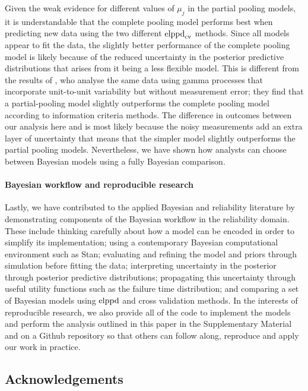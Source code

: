 \documentclass{article}
\begin{document}
Given the weak evidence for different values of $\mu_j$ in the partial pooling models, it is understandable that the complete pooling model performs best when predicting new data using the two different $\hbox{elppd}_\text{cv}$ methods. Since all models appear to fit the data, the slightly better performance of the complete pooling model is likely because of the reduced uncertainty in the posterior predictive distributions that arises from it being a less flexible model. This is different from the results of \citet{rodriguez-picon_degradation_2018}, who analyse the same data using gamma processes that incorporate unit-to-unit variability but without measurement error; they find that a partial-pooling model slightly outperforms the complete pooling model according to information criteria methods. The difference in outcomes between our analysis here and \citet{rodriguez-picon_degradation_2018} is most likely because the noisy measurements add an extra layer of uncertainty that means that the simpler model slightly outperforms the partial pooling models. Nevertheless, we have shown how analysts can choose between Bayesian models using a fully Bayesian comparison.

\paragraph*{Bayesian workflow and reproducible research} Lastly, we have contributed to the applied Bayesian and reliability literature by demonstrating components of the Bayesian workflow in the reliability domain. These include thinking carefully about how a model can be encoded in order to simplify its implementation; using a contemporary Bayesian computational environment such as Stan; evaluating and refining the model and priors through simulation before fitting the data; interpreting uncertainty in the posterior through posterior predictive distributions; propagating this uncertainty through useful utility functions such as the failure time distribution; and comparing a set of Bayesian models using $\hbox{elppd}$ and cross validation methods. In the interests of reproducible research, we also provide all of the code to implement the models and perform the analysis outlined in this paper in the Supplementary Material and on a Github repository \citep{code_repo} so that others can follow along, reproduce and apply our work in practice.

\newpage

\subsection*{Acknowledgements}
\end{document}
